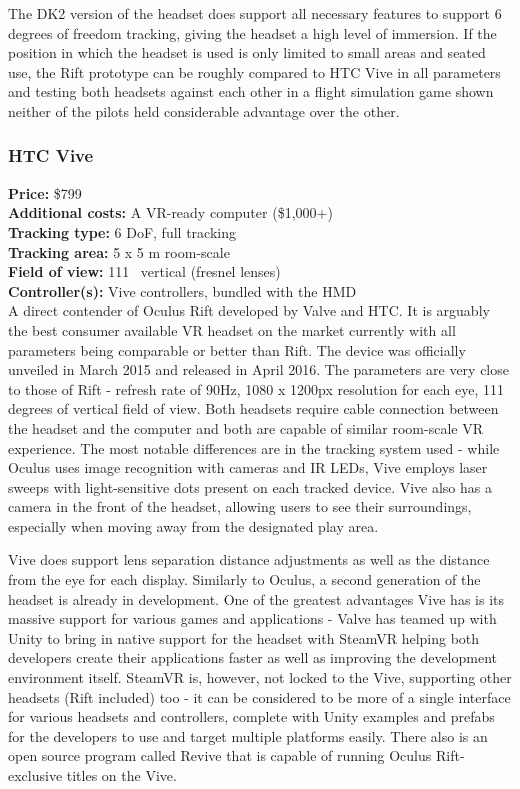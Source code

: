 \documentclass[12pt, a4paper]{article}
\begin{document}
The DK2 version of the headset does support all necessary features to support 6 degrees of freedom tracking, giving the headset a high level of immersion. If the position in which the headset is used is only limited to small areas and seated use, the Rift prototype can be roughly compared to HTC Vive in all parameters and testing both headsets against each other in a flight simulation game shown neither of the pilots held considerable advantage over the other.

\subsubsection{HTC Vive}
\vspace*{-5mm}
\textbf{Price:} \$799\\
\textbf{Additional costs:} A VR-ready computer (\$1,000+)\\
\textbf{Tracking type:} 6 DoF, full tracking\\
\textbf{Tracking area:} 5 x 5 m room-scale\\
\textbf{Field of view:} 111\degree~ vertical (fresnel lenses)\\
\textbf{Controller(s):} Vive controllers, bundled with the HMD \bigskip \\
A direct contender of Oculus Rift developed by Valve and HTC. It is arguably the best consumer available VR headset on the market currently with all parameters being comparable or better than Rift. The device was officially unveiled in March 2015 and released in April 2016. The parameters are very close to those of Rift - refresh rate of 90Hz, 1080 x 1200px resolution for each eye, 111 degrees of vertical field of view. Both headsets require cable connection between the headset and the computer and both are capable of similar room-scale VR experience. The most notable differences are in the tracking system used - while Oculus uses image recognition with cameras and IR LEDs, Vive employs laser sweeps with light-sensitive dots present on each tracked device. Vive also has a camera in the front of the headset, allowing users to see their surroundings, especially when moving away from the designated play area.

Vive does support lens separation distance adjustments as well as the distance from the eye for each display. Similarly to Oculus, a second generation of the headset is already in development. One of the greatest advantages Vive has is its massive support for various games and applications - Valve has teamed up with Unity to bring in native support for the headset with SteamVR helping both developers create their applications faster as well as improving the development environment itself. SteamVR is, however, not locked to the Vive, supporting other headsets (Rift included) too - it can be considered to be more of a single interface for various headsets and controllers, complete with Unity examples and prefabs for the developers to use and target multiple platforms easily. There also is an open source program called Revive that is capable of running Oculus Rift-exclusive titles on the Vive.
\end{document}
